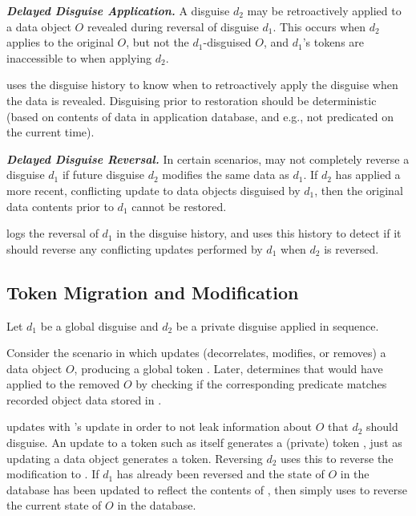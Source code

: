 \noindent\textbf{\emph{Delayed Disguise Application.}}
A disguise $d_2$ may be retroactively applied to a data object $O$ revealed during reversal of
disguise $d_1$.  This occurs when $d_2$ applies to the original $O$, but not the $d_1$-disguised
$O$, and $d_1$'s tokens are inaccessible to \sys when applying $d_2$.

\sys uses the disguise history to know when to retroactively apply the
disguise when the data is revealed.  Disguising prior to restoration should be deterministic (based
on contents of data in application database, and e.g., not predicated on the current time).

\vspace{6pt}\noindent\textbf{\emph{Delayed Disguise Reversal.}}
In certain scenarios, \sys may not completely reverse a disguise $d_1$ if future disguise $d_2$
modifies the same data as $d_1$. If $d_2$ has applied a more recent, conflicting update to data
objects disguised by $d_1$, then the original data contents prior to $d_1$ cannot be restored. 

\sys logs the reversal of $d_1$ in the disguise history, and uses this history to detect if it
should reverse any conflicting updates performed by $d_1$ when $d_2$ is reversed.

\subsection{Token Migration and Modification}
Let $d_1$ be a global disguise and $d_2$ be a private disguise applied in sequence.

Consider the scenario in which  updates (decorrelates, modifies, or removes) a data object
$O$, producing a global token . Later, \sys determines that  would have applied to the
removed $O$ by checking if the corresponding  predicate matches recorded object data stored in .

\sys updates  with 's update in order to not leak information about $O$ that $d_2$ should disguise. An update to a token such as  itself generates a (private) token , just as updating a data object generates a token. Reversing $d_2$ uses this  to reverse the modification to . If $d_1$ has
already been reversed and the state of $O$ in the database has been updated to reflect the contents of ,
then \sys simply uses  to reverse the current state of $O$ in the database. 

